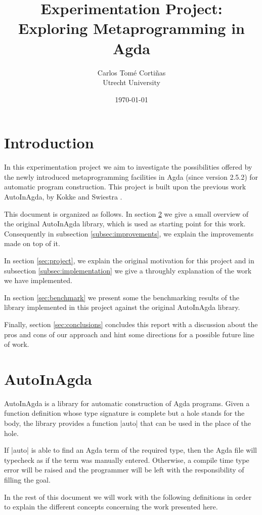 \documentclass[a4paper]{article}
\author{Carlos Tom\'e Corti\~nas \\ Utrecht University}
\title{Experimentation Project: Exploring Metaprogramming in Agda}
\date{\today}
\begin{document}
\maketitle

\section{Introduction}

In this experimentation project we aim to investigate the possibilities offered by
the newly introduced metaprogramming facilities in Agda (since version 2.5.2)
for automatic program construction. This project is built upon the previous work
AutoInAgda, by Kokke and Swiestra \cite{Kokke2015}.

This document is organized as follows. In section \ref{sec:AutoInAgda} we give a
small overview of the original AutoInAgda library, which is used as starting
point for this work. Consequently in subsection \ref{subsec:improvements}, we
explain the improvements made on top of it.

In section \ref{sec:project}, we explain the original motivation for this
project and in subsection \ref{subsec:implementation} we give a throughly
explanation of the work we have implemented.

In section \ref{sec:benchmark} we present some the benchmarking results of the
library implemented in this project against the original AutoInAgda library.

Finally, section \ref{sec:conclusions} concludes this report with a discussion
about the pros and cons of our approach and hint some directions for a
possible future line of work.

\section{AutoInAgda}
\label{sec:AutoInAgda}

AutoInAgda is a library for automatic construction of Agda programs. Given a
function definition whose type signature is complete but a hole stands for the
body, the library provides a function |auto| that can be used in the place of
the hole.

If |auto| is able to find an Agda term of the required type, then the Agda file
will typecheck as if the term was manually entered. Otherwise, a compile time
type error will be raised and the programmer will be left with the
responsibility of filling the goal.

In the rest of this document we will work with the following definitions in
order to explain the different concepts concerning the work presented here.
\end{document}
